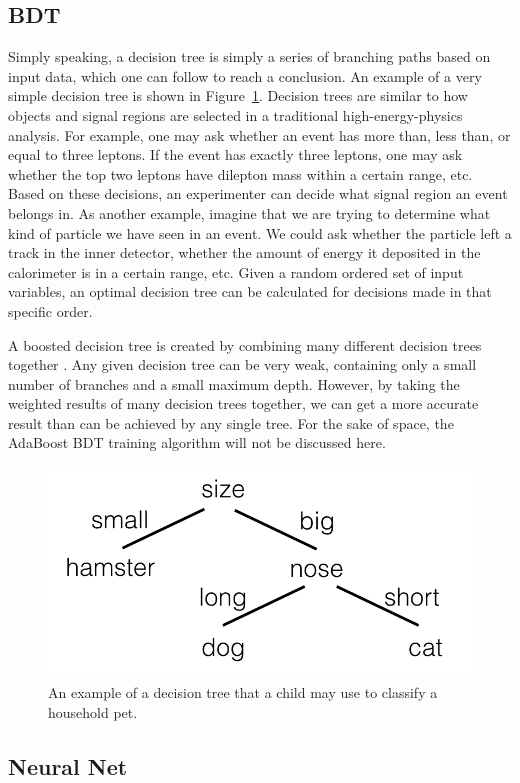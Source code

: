 \documentclass{article}
\begin{document}
\subsection*{BDT}

Simply speaking, a decision tree is simply a series of branching paths based on input data, which one can follow to reach a conclusion. An example of a very simple decision tree is shown in Figure~\ref{decision_tree}. Decision trees are similar to how objects and signal regions are selected in a traditional high-energy-physics analysis. For example, one may ask whether an event has more than, less than, or equal to three leptons. If the event has exactly three leptons, one may ask whether the top two leptons have dilepton mass within a certain range, etc. Based on these decisions, an experimenter can decide what signal region an event belongs in. As another example, imagine that we are trying to determine what kind of particle we have seen in an event. We could ask whether the particle left a track in the inner detector, whether the amount of energy it deposited in the calorimeter is in a certain range, etc. Given a random ordered set of input variables, an optimal decision tree can be calculated for decisions made in that specific order.

A boosted decision tree is created by combining many different decision trees together \cite{BDT}. Any given decision tree can be very weak, containing only a small number of branches and a small maximum depth. However, by taking the weighted results of many decision trees together, we can get a more accurate result than can be achieved by any single tree. For the sake of space, the AdaBoost BDT training algorithm will not be discussed here.

\begin{figure}[t]
    \centering
    \includegraphics[width=0.5\linewidth]{images/decision_tree.png}
    \caption{An example of a decision tree that a child may use to classify a household pet.}
    \label{decision_tree}
\end{figure}

\subsection*{Neural Net}
\end{document}
